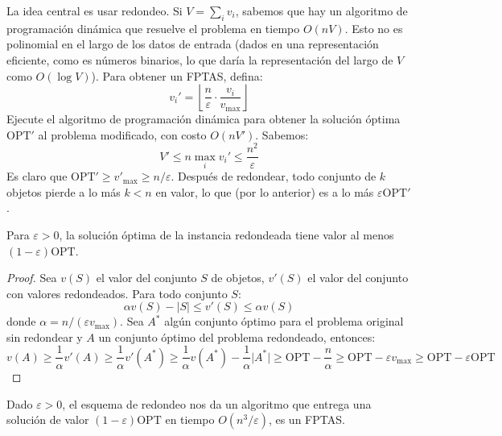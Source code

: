   La idea central es usar redondeo.
  Si \(V = \sum_i v_i\),
  sabemos que hay un algoritmo de programación dinámica
  que resuelve el problema en tiempo \(O(n V)\).
  Esto no es polinomial en el largo de los datos de entrada
  (dados en una representación eficiente,
   como es números binarios,
   lo que daría la representación del largo de \(V\)
   como \(O(\log V)\)).
  Para obtener un FPTAS,
  defina:
  \begin{equation*}
    v_i'
      = \left\lfloor
          \frac{n}{\varepsilon} \cdot \frac{v_i}{v_{\mathrm{max}}}
        \right\rfloor
  \end{equation*}
  Ejecute el algoritmo de programación dinámica
  para obtener la solución óptima \(\mathrm{OPT}'\)
  al problema modificado,
  con costo \(O(n V')\).
  Sabemos:
  \begin{equation*}
    V' \le n \max_i v_i' \le \frac{n^2}{\varepsilon}
  \end{equation*}
  Es claro que \(\mathrm{OPT}' \ge v'_{\mathrm{max}} \ge n / \varepsilon\).
  Después de redondear,
  todo conjunto de \(k\) objetos pierde a lo más \(k < n\) en valor,
  lo que
  (por lo anterior)
  es a lo más \(\varepsilon \mathrm{OPT}'\).

  \begin{proposition}
    Para \(\varepsilon > 0\),
    la solución óptima de la instancia redondeada
    tiene valor al menos \((1 - \varepsilon) \mathrm{OPT}\).
  \end{proposition}
  \begin{proof}
    Sea \(v(S)\) el valor del conjunto \(S\) de objetos,
    \(v'(S)\) el valor del conjunto con valores redondeados.
    Para todo conjunto \(S\):
    \begin{equation*}
      \alpha v(S) - \lvert S \rvert
        \le v'(S)
        \le \alpha v(S)
    \end{equation*}
    donde \(\alpha = n / (\varepsilon v_{\mathrm{max}})\).
    Sea \(A^*\) algún conjunto óptimo para el problema original sin redondear
    y \(A\) un conjunto óptimo del problema redondeado,
    entonces:
    \begin{equation*}
      v(A)
        \ge \frac{1}{\alpha} v'(A)
        \ge \frac{1}{\alpha} v'(A^*)
        \ge \frac{1}{\alpha} v(A^*) - \frac{1}{\alpha} \lvert A^* \rvert
        \ge \mathrm{OPT} - \frac{n}{\alpha}
        \ge \mathrm{OPT} - \varepsilon v_{\mathrm{max}}
        \ge \mathrm{OPT} - \varepsilon \mathrm{OPT}
    \end{equation*}
    \qedhere
  \end{proof}
  Dado \(\varepsilon > 0\),
  el esquema de redondeo nos da un algoritmo
  que entrega una solución de valor \((1 - \varepsilon) \mathrm{OPT}\)
  en tiempo \(O(n^3 / \varepsilon)\),
  es un FPTAS.


